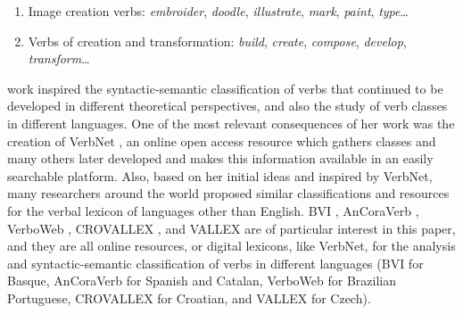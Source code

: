 \documentclass[english]{textolivre}
\begin{document}
\begin{enumerate}[label=(\arabic*),resume]
\item \label{itm5} Image creation verbs: \textit{embroider}, \textit{doodle}, \textit{illustrate}, \textit{mark}, \textit{paint}, \textit{type}…
\item \label{itm6} Verbs of creation and transformation: \textit{build}, \textit{create}, \textit{compose}, \textit{develop}, \textit{transform}…
\end{enumerate}
\cite[p.~169--179]{levin_english_1993}

 work inspired the syntactic-semantic classification of verbs that continued to be developed in different theoretical perspectives, and also the study of verb classes in different languages. One of the most relevant consequences of her work was the creation of VerbNet \cite{schuler_verbnet:_2005,kipper_large-scale_2008}, an online open access resource which gathers  classes and many others later developed and makes this information available in an easily searchable platform. Also, based on her initial ideas and inspired by VerbNet, many researchers around the world proposed similar classifications and resources for the verbal lexicon of languages other than English. BVI \cite{estarrona_methodology_2015}, AnCoraVerb \cite{aparicio_ancora-verb:_2008,taule_ancora-net:_2010}, VerboWeb \cite{cancado_verboweb:_2017}, CROVALLEX \cite{preradovic_crovallex:_2009,preradovic_crovallex_2010}, and VALLEX \cite{kettnerova_syntax-semantics_2012} are of particular interest in this paper, and they are all online resources, or digital lexicons, like VerbNet, for the analysis and syntactic-semantic classification of verbs in different languages (BVI for Basque, AnCoraVerb for Spanish and Catalan, VerboWeb for Brazilian Portuguese, CROVALLEX for Croatian, and VALLEX for Czech).
\end{document}
